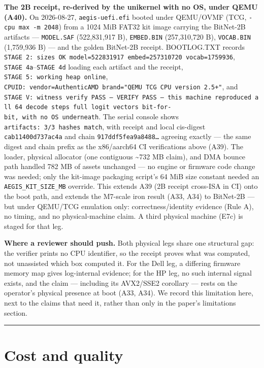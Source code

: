 \documentclass[11pt]{article}
\begin{document}
\textbf{The 2B receipt, re-derived by the unikernel with no OS, under QEMU (A40).} On 2026-08-27,
\texttt{aegis-uefi.efi} booted under QEMU/OVMF (TCG, \texttt{-cpu\ max\ -m\ 2048}) from a 1024 MiB FAT32 kit image
carrying the BitNet-2B artifacts --- \texttt{MODEL.SAF} (522,831,917 B), \texttt{EMBED.BIN} (257,310,720 B),
\texttt{VOCAB.BIN} (1,759,936 B) --- and the golden BitNet-2B receipt. BOOTLOG.TXT records \texttt{STAGE\ 2:\ sizes\ OK\ model=522831917\ embed=257310720\ vocab=1759936}, \texttt{STAGE\ 4a}--\texttt{STAGE\ 4d} loading each artifact and
the receipt, \texttt{STAGE\ 5:\ working\ heap\ online}, \texttt{CPUID:\ vendor=AuthenticAMD\ brand="QEMU\ TCG\ CPU\ version\ 2.5+"}, and \texttt{STAGE\ V:\ witness\ verify\ PASS\ —\ VERIFY\ PASS\ —\ this\ machine\ reproduced\ all\ 64\ decode\ steps\textquotesingle{}\ full\ logit\ vectors\ bit-for-bit,\ with\ no\ OS\ underneath}. The serial console shows
\texttt{artifacts:\ 3/3\ hashes\ match}, with receipt and local cis-digest \texttt{cab11400d737ac4a} and chain
\texttt{917ddf5fea9a8488…} agreeing exactly --- the same digest and chain prefix as the x86/aarch64 CI
verifications above (A39). The loader, physical allocator (one contiguous \textasciitilde732 MB claim), and DMA
bounce path handled 782 MB of assets unchanged --- no engine or firmware code change was needed;
only the kit-image packaging script's 64 MiB size constant needed an \texttt{AEGIS\_KIT\_SIZE\_MB} override.
This extends A39 (2B receipt cross-ISA in CI) onto the boot path, and extends the M7-scale iron
result (A33, A34) to BitNet-2B --- but under QEMU/TCG emulation only: correctness/identity evidence
(Rule A), no timing, and no physical-machine claim. A third physical machine (E7c) is staged for
that leg.

\textbf{Where a reviewer should push.} Both physical legs share one structural gap: the verifier
prints no CPU identifier, so the receipt proves what was computed, not unassisted which box
computed it. For the Dell leg, a differing firmware memory map gives log-internal evidence; for
the HP leg, no such internal signal exists, and the claim --- including its AVX2/SSE2 corollary ---
rests on the operator's physical presence at boot (A33, A34). We record this limitation here,
next to the claims that need it, rather than only in the paper's limitations section.

\begin{center}\rule{0.5\linewidth}{0.5pt}\end{center}

\section{Cost and quality}\label{cost-and-quality}
\end{document}
